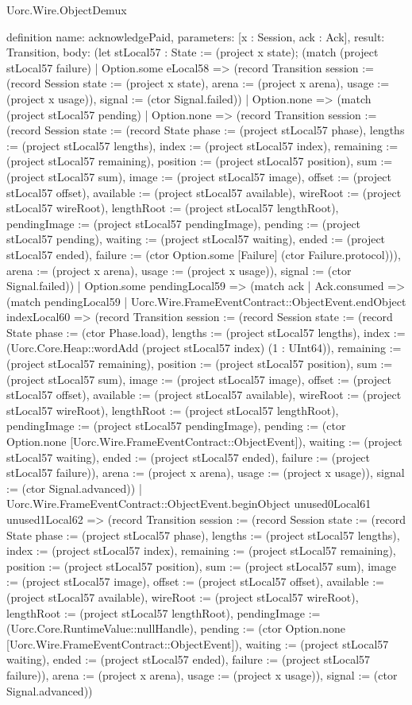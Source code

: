 \begin{lexlean}{Uorc.Wire.ObjectDemux}
\begin{semanticmodule}
definition{
  name: acknowledgePaid,
  parameters: [x : Session, ack : Ack],
  result: Transition,
  body: (let stLocal57 : State := (project x state); (match (project stLocal57 failure)
    | Option.some eLocal58 => (record Transition {session := (record Session {state := (project x state), arena := (project x arena), usage := (project x usage)}), signal := (ctor Signal.failed)})
    | Option.none => (match (project stLocal57 pending)
      | Option.none => (record Transition {session := (record Session {state := (record State {phase := (project stLocal57 phase), lengths := (project stLocal57 lengths), index := (project stLocal57 index), remaining := (project stLocal57 remaining), position := (project stLocal57 position), sum := (project stLocal57 sum), image := (project stLocal57 image), offset := (project stLocal57 offset), available := (project stLocal57 available), wireRoot := (project stLocal57 wireRoot), lengthRoot := (project stLocal57 lengthRoot), pendingImage := (project stLocal57 pendingImage), pending := (project stLocal57 pending), waiting := (project stLocal57 waiting), ended := (project stLocal57 ended), failure := (ctor Option.some [Failure] (ctor Failure.protocol))}), arena := (project x arena), usage := (project x usage)}), signal := (ctor Signal.failed)})
      | Option.some pendingLocal59 => (match ack
        | Ack.consumed => (match pendingLocal59
          | Uorc.Wire.FrameEventContract::ObjectEvent.endObject indexLocal60 => (record Transition {session := (record Session {state := (record State {phase := (ctor Phase.load), lengths := (project stLocal57 lengths), index := (Uorc.Core.Heap::wordAdd (project stLocal57 index) (1 : UInt64)), remaining := (project stLocal57 remaining), position := (project stLocal57 position), sum := (project stLocal57 sum), image := (project stLocal57 image), offset := (project stLocal57 offset), available := (project stLocal57 available), wireRoot := (project stLocal57 wireRoot), lengthRoot := (project stLocal57 lengthRoot), pendingImage := (project stLocal57 pendingImage), pending := (ctor Option.none [Uorc.Wire.FrameEventContract::ObjectEvent]), waiting := (project stLocal57 waiting), ended := (project stLocal57 ended), failure := (project stLocal57 failure)}), arena := (project x arena), usage := (project x usage)}), signal := (ctor Signal.advanced)})
          | Uorc.Wire.FrameEventContract::ObjectEvent.beginObject unused0Local61 unused1Local62 => (record Transition {session := (record Session {state := (record State {phase := (project stLocal57 phase), lengths := (project stLocal57 lengths), index := (project stLocal57 index), remaining := (project stLocal57 remaining), position := (project stLocal57 position), sum := (project stLocal57 sum), image := (project stLocal57 image), offset := (project stLocal57 offset), available := (project stLocal57 available), wireRoot := (project stLocal57 wireRoot), lengthRoot := (project stLocal57 lengthRoot), pendingImage := (Uorc.Core.RuntimeValue::nullHandle), pending := (ctor Option.none [Uorc.Wire.FrameEventContract::ObjectEvent]), waiting := (project stLocal57 waiting), ended := (project stLocal57 ended), failure := (project stLocal57 failure)}), arena := (project x arena), usage := (project x usage)}), signal := (ctor Signal.advanced)})
}
\end{semanticmodule}
\end{lexlean}
